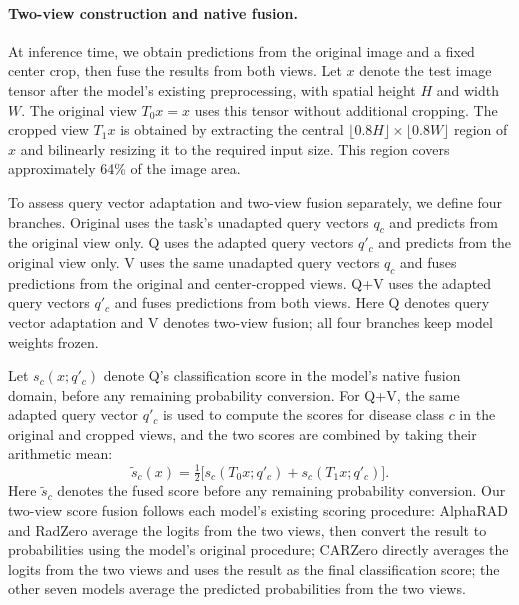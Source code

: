\paragraph{Two-view construction and native fusion.}
\label{supp:view_fusion}
At inference time, we obtain predictions from the original image and a fixed center crop, then fuse the results from both views. Let $x$ denote the test image tensor after the model's existing preprocessing, with spatial height $H$ and width $W$. The original view $T_0x=x$ uses this tensor without additional cropping. The cropped view $T_1x$ is obtained by extracting the central $\lfloor0.8H\rfloor\times\lfloor0.8W\rfloor$ region of $x$ and bilinearly resizing it to the required input size. This region covers approximately 64\% of the image area.

To assess query vector adaptation and two-view fusion separately, we define four branches. Original uses the task's unadapted query vectors $q_c$ and predicts from the original view only. Q uses the adapted query vectors $q'_c$ and predicts from the original view only. V uses the same unadapted query vectors $q_c$ and fuses predictions from the original and center-cropped views. Q+V uses the adapted query vectors $q'_c$ and fuses predictions from both views. Here Q denotes query vector adaptation and V denotes two-view fusion; all four branches keep model weights frozen.

Let $s_c(x;q'_c)$ denote Q's classification score in the model's native fusion domain, before any remaining probability conversion. For Q+V, the same adapted query vector $q'_c$ is used to compute the scores for disease class $c$ in the original and cropped views, and the two scores are combined by taking their arithmetic mean:
\begin{equation}
\widetilde s_c(x)=\tfrac12\big[s_c(T_0x;q'_c)+s_c(T_1x;q'_c)\big].
\label{eq:supp-view-score}
\end{equation}
Here $\widetilde s_c$ denotes the fused score before any remaining probability conversion. Our two-view score fusion follows each model's existing scoring procedure: AlphaRAD and RadZero average the logits from the two views, then convert the result to probabilities using the model's original procedure; CARZero directly averages the logits from the two views and uses the result as the final classification score; the other seven models average the predicted probabilities from the two views.

